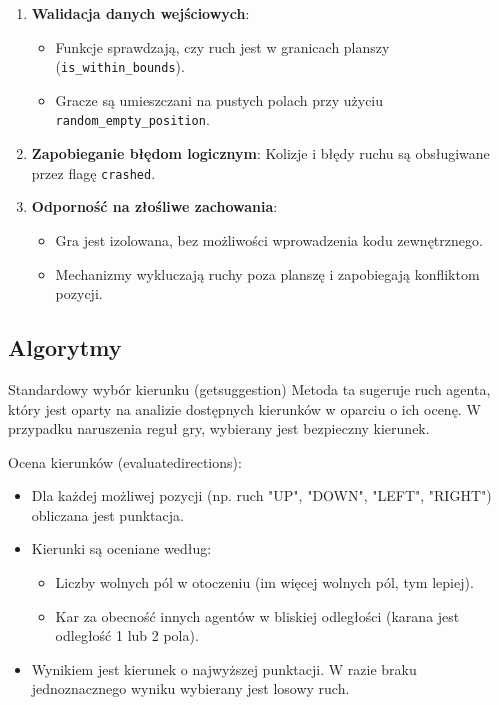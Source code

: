\documentclass[12pt,a4paper]{article}
\begin{document}
\begin{enumerate}
    \item \textbf{Walidacja danych wejściowych}:
    \begin{itemize}
        \item Funkcje sprawdzają, czy ruch jest w granicach planszy (\verb|is_within_bounds|).
        \item Gracze są umieszczani na pustych polach przy użyciu \verb|random_empty_position|.
    \end{itemize}
    \item \textbf{Zapobieganie błędom logicznym}:
Kolizje i błędy ruchu są obsługiwane przez flagę \verb|crashed|.

    \item \textbf{Odporność na złośliwe zachowania}:
    \begin{itemize}
        \item Gra jest izolowana, bez możliwości wprowadzenia kodu zewnętrznego.
        \item Mechanizmy wykluczają ruchy poza planszę i zapobiegają konfliktom pozycji.
    \end{itemize}
\end{enumerate}

	
\subsection*{Algorytmy}
Standardowy wybór kierunku (get\textunderscore suggestion)
Metoda ta sugeruje ruch agenta, który jest oparty na analizie dostępnych kierunków w oparciu o ich ocenę. W przypadku naruszenia reguł gry, wybierany jest bezpieczny kierunek.


Ocena kierunków (\textunderscore evaluate\textunderscore directions):
\begin{itemize}
    \item Dla każdej możliwej pozycji (np. ruch "UP", "DOWN", "LEFT", "RIGHT") obliczana jest punktacja.
    \item Kierunki są oceniane według: 
        \begin{itemize}
            \item Liczby wolnych pól w otoczeniu (im więcej wolnych pól, tym lepiej).
            \item Kar za obecność innych agentów w bliskiej odległości (karana jest odległość 1 lub 2 pola).
        \end{itemize}
    \item Wynikiem jest kierunek o najwyższej punktacji. W razie braku jednoznacznego wyniku wybierany jest losowy ruch.
\end{itemize}
\end{document}
